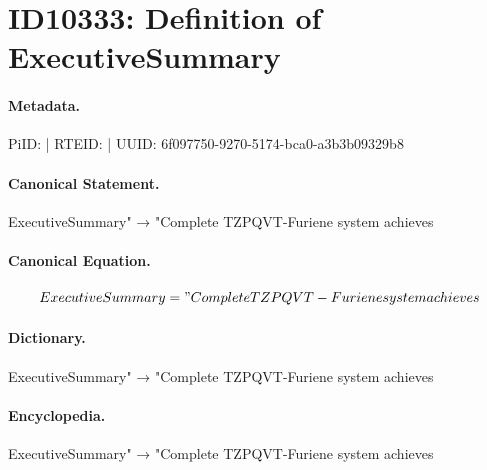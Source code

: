 \section*{ID10333: Definition of ExecutiveSummary}
\paragraph{Metadata.}
PiID:  | RTEID:  | UUID: 6f097750-9270-5174-bca0-a3b3b09329b8

\paragraph{Canonical Statement.}
ExecutiveSummary" → "Complete TZPQVT-Furiene system achieves

\paragraph{Canonical Equation.}
\[
ExecutiveSummary = "Complete TZPQVT-Furiene system achieves
\]

\paragraph{Dictionary.}
ExecutiveSummary" → "Complete TZPQVT-Furiene system achieves

\paragraph{Encyclopedia.}
ExecutiveSummary" → "Complete TZPQVT-Furiene system achieves
